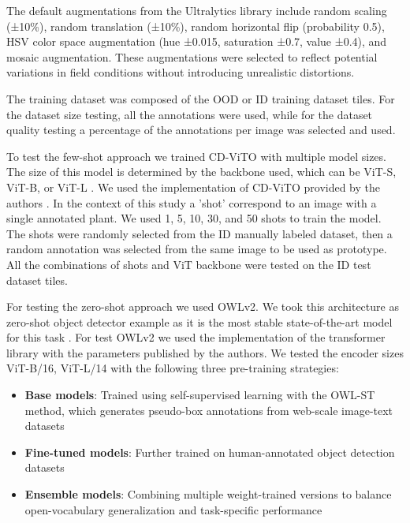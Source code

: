 \documentclass[journal,article,submit,pdftex,moreauthors]{Definitions/mdpi}
\begin{document}
The default augmentations from the Ultralytics library include random scaling (±10\%), 
random translation (±10\%), random horizontal flip (probability 0.5), 
HSV color space augmentation (hue ±0.015, saturation ±0.7, value ±0.4), 
and mosaic augmentation. These augmentations were selected to reflect potential 
variations in field conditions without introducing unrealistic distortions.

The training dataset was composed of the OOD or ID training dataset tiles.
For the dataset size testing, all the annotations were used, while for the dataset quality testing
a percentage of the annotations per image was selected and used.

To test the few-shot approach we trained CD-ViTO with multiple model sizes.
The size of this model is determined by the backbone used, which can be ViT-S, ViT-B, or ViT-L \cite{oquabDINOv2LearningRobust2024}. 
We used the implementation of CD-ViTO provided by the authors \cite{fuCrossDomainFewShotObject2024}.
In the context of this study a 'shot' correspond to an image with a single annotated plant. 
We used 1, 5, 10, 30, and 50 shots to train the model.
The shots were randomly selected from the ID manually labeled dataset, then a 
random annotation was selected from the same image to be used as prototype.
All the combinations of shots and ViT backbone were tested on the ID test dataset tiles.

For testing the zero-shot approach we used OWLv2.
We took this architecture as zero-shot object detector example as it is the most stable 
state-of-the-art model for this task \cite{mindererScalingOpenVocabularyObject2023,liuGroundingDINOMarrying2025}.
For test OWLv2 we used the implementation of the transformer library \cite{wolfTransformersStateoftheArtNatural2020}
with the parameters published by the authors.
We tested the encoder sizes ViT-B/16, ViT-L/14 with the following three pre-training 
strategies:

\begin{itemize}
    \item \textbf{Base models}: Trained using self-supervised learning with the OWL-ST method, which generates pseudo-box annotations from web-scale image-text datasets
    \item \textbf{Fine-tuned models}: Further trained on human-annotated object detection datasets
    \item \textbf{Ensemble models}: Combining multiple weight-trained versions to balance open-vocabulary generalization and task-specific performance
\end{itemize}
\end{document}
